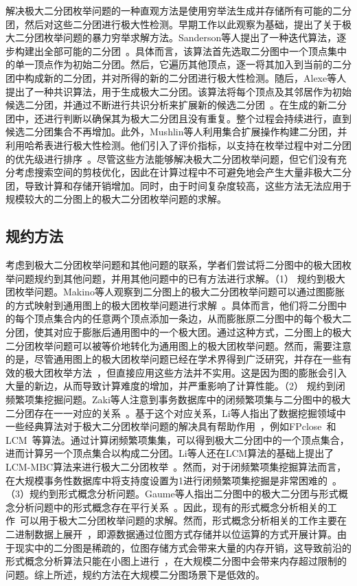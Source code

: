 解决极大二分团枚举问题的一种直观方法是使用穷举法生成并存储所有可能的二分团，然后对这些二分团进行极大性检测。早期工作以此观察为基础，提出了关于极大二分团枚举问题的暴力穷举求解方法。Sanderson等人提出了一种迭代算法，逐步构建出全部可能的二分团~\cite{exhaust03}。具体而言，该算法首先选取二分图中一个顶点集中的单一顶点作为初始二分团。然后，它遍历其他顶点，逐一将其加入到当前的二分团中构成新的二分团，并对所得的新的二分团进行极大性检测。随后，Alexe等人提出了一种共识算法，用于生成极大二分团。该算法将每个顶点及其邻居作为初始候选二分团，并通过不断进行共识分析来扩展新的候选二分团~\cite{MICA04}。在生成的新二分团中，还进行判断以确保其为极大二分团且没有重复。整个过程会持续进行，直到候选二分团集合不再增加。此外，Mushlin等人利用集合扩展操作构建二分团，并利用哈希表进行极大性检测。他们引入了评价指标，以支持在枚举过程中对二分团的优先级进行排序~\cite{exhaust07}。尽管这些方法能够解决极大二分团枚举问题，但它们没有充分考虑搜索空间的剪枝优化，因此在计算过程中不可避免地会产生大量非极大二分团，导致计算和存储开销增加。同时，由于时间复杂度较高，这些方法无法应用于规模较大的二分图上的极大二分团枚举问题的求解。

\subsection{规约方法}

考虑到极大二分团枚举问题和其他问题的联系，学者们尝试将二分图中的极大团枚举问题规约到其他问题，并用其他问题中的已有方法进行求解。（1） 规约到极大团枚举问题。Makino等人观察到二分图上的极大二分团枚举问题可以通过图膨胀的方式映射到通用图上的极大团枚举问题进行求解~\cite{Makino04}。具体而言，他们将二分图中的每个顶点集合内的任意两个顶点添加一条边，从而膨胀原二分图中的每个极大二分团，使其对应于膨胀后通用图中的一个极大团。通过这种方式，二分图上的极大二分团枚举问题可以被等价地转化为通用图上的极大团枚举问题。然而，需要注意的是，尽管通用图上的极大团枚举问题已经在学术界得到广泛研究，并存在一些有效的极大团枚举方法~\cite{MCEparallel20,MCE20,MCE22,MCE-GPU21,MCE-22}，但直接应用这些方法并不实用。这是因为图的膨胀会引入大量的新边，从而导致计算难度的增加，并严重影响了计算性能。（2） 规约到闭频繁项集挖掘问题。Zaki等人注意到事务数据库中的闭频繁项集与二分图中的极大二分团存在一一对应的关系~\cite{FCIM98}。基于这个对应关系，Li等人指出了数据挖掘领域中一些经典算法对于极大二分团枚举问题的解决具有帮助作用~\cite{correspondence05}，例如FPclose~\cite{fpclose04}和LCM~\cite{lcm04}等算法。通过计算闭频繁项集集，可以得到极大二分团中的一个顶点集合，进而计算另一个顶点集合以构成二分团。Li等人还在LCM算法的基础上提出了LCM-MBC算法来进行极大二分团枚举~\cite{lcmmbc07}。然而，对于闭频繁项集挖掘算法而言，在大规模事务性数据库中将支持度设置为1进行闭频繁项集挖掘是非常困难的~\cite{iMBEA14}。（3）规约到形式概念分析问题。Gaume等人指出二分图中的极大二分团与形式概念分析问题中的形式概念存在平行关系~\cite{fcambe10}。因此，现有的形式概念分析相关的工作~\cite{FCA15,FCA21,FCA22}可以用于极大二分团枚举问题的求解。然而，形式概念分析相关的工作主要在二进制数据上展开~\cite{FCA15}，即源数据通过位图方式存储并以位运算的方式开展计算。由于现实中的二分图是稀疏的，位图存储方式会带来大量的内存开销，这导致前沿的形式概念分析算法只能在小图上进行~\cite{FCA21,FCA22}，在大规模二分图中会带来内存超过限制的问题。综上所述，规约方法在大规模二分图场景下是低效的。

